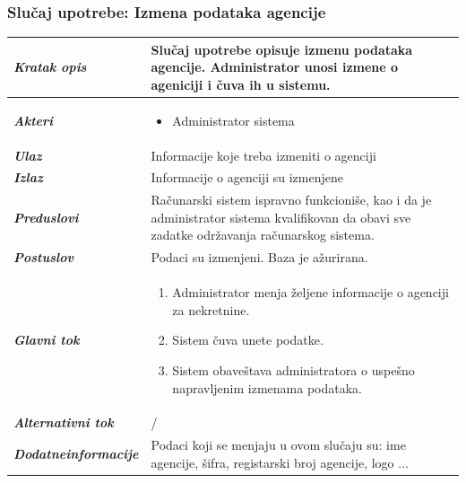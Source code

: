 \documentclass[20pt]{article}
\begin{document}
\subsubsection{\bfseries \large Slu\v{c}aj upotrebe: Izmena podataka agencije}
\begin{center}
\begin{longtable}{p{0.23\linewidth} p{0.77\linewidth}}
\hline

 {\it \bfseries Kratak opis} & Slu\v {c}aj upotrebe opisuje izmenu podataka agencije. Administrator unosi izmene o ageniciji i \v {c}uva ih u sistemu.\\ 

 \hline
 {\it \bfseries Akteri} & \begin{itemize}
    \item Administrator sistema
\end{itemize}\\
\hline

 {\it \bfseries Ulaz} & Informacije koje treba izmeniti o agenciji\\ 
 \hline
 
 {\it \bfseries Izlaz} & Informacije o agenciji su izmenjene\\
 \hline
 
 {\it \bfseries Preduslovi} & Ra\v {c}unarski sistem ispravno funkcioni\v {s}e, kao i da je administrator sistema kvalifikovan da obavi sve zadatke odr\v {z}avanja ra\v {c}unarskog sistema.\\
 \hline

 {\it \bfseries Postuslov} & Podaci su izmenjeni. Baza je a\v {z}urirana.\\
 \hline

     {\it \bfseries Glavni tok} &  
     \begin{enumerate}
         \item  Administrator menja \v {z}eljene informacije o agenciji za nekretnine.
         \item Sistem \v {c}uva unete podatke.
         \item  Sistem obave\v {s}tava administratora o uspe\v {s}no napravljenim izmenama podataka.
    \end{enumerate}\\
 \hline

 {\it \bfseries Alternativni tok} & /\\
 \hline
 
 {\it \bfseries Dodatne\newline informacije} & Podaci koji se menjaju u ovom slu\v {c}aju su: ime agencije, \v {s}ifra, registarski broj agencije, logo ...\\
 \hline

\end{longtable}
\end{center}
\newpage
\end{document}
